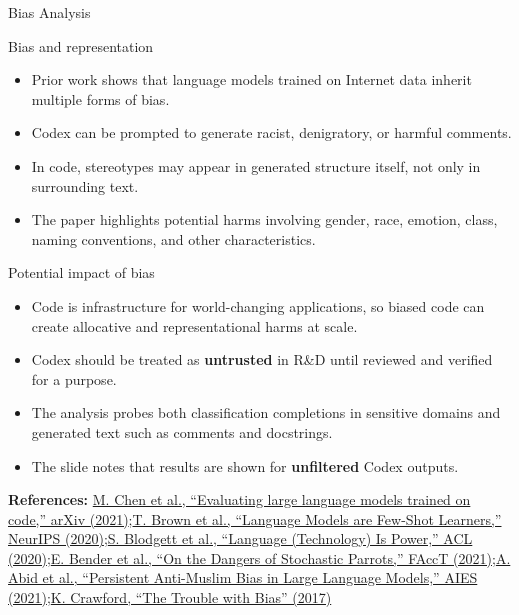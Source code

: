 \documentclass[aspectratio=43,9pt]{beamer}
\newcommand{\srclink}[2]{\href{#2}{\textcolor{black!68}{#1}}}
\newcommand{\sep}{;\hspace{0.35em}}
\newcommand{\refline}[2][References]{%
  \vfill
  {\raggedright\fontsize{5.1}{5.5}\selectfont\color{black!68}\textbf{#1:} #2\par}%
}
\newcommand{\srcChen}{\srclink{M. Chen et al., ``Evaluating large language models trained on code,'' arXiv (2021)}{https://arxiv.org/abs/2107.03374}}
\newcommand{\srcBrown}{\srclink{T. Brown et al., ``Language Models are Few-Shot Learners,'' NeurIPS (2020)}{https://arxiv.org/abs/2005.14165}}
\newcommand{\srcBlodgett}{\srclink{S. Blodgett et al., ``Language (Technology) Is Power,'' ACL (2020)}{https://aclanthology.org/2020.acl-main.485/}}
\newcommand{\srcBender}{\srclink{E. Bender et al., ``On the Dangers of Stochastic Parrots,'' FAccT (2021)}{https://s10251.pcdn.co/pdf/2021-bender-parrots.pdf}}
\newcommand{\srcAbid}{\srclink{A. Abid et al., ``Persistent Anti-Muslim Bias in Large Language Models,'' AIES (2021)}{https://arxiv.org/abs/2101.05783}}
\newcommand{\srcCrawfordBias}{\srclink{K. Crawford, ``The Trouble with Bias'' (2017)}{https://ainowinstitute.org/news/the-trouble-with-bias}}
\begin{document}
\begin{frame}{Bias Analysis}
\scriptsize
\begin{block}{Bias and representation}
\begin{itemize}
  \item Prior work shows that language models trained on Internet data inherit multiple forms of bias.
  \item Codex can be prompted to generate racist, denigratory, or harmful comments.
  \item In code, stereotypes may appear in generated structure itself, not only in surrounding text.
  \item The paper highlights potential harms involving gender, race, emotion, class, naming conventions, and other characteristics.
\end{itemize}
\end{block}

\begin{block}{Potential impact of bias}
\begin{itemize}
  \item Code is infrastructure for world-changing applications, so biased code can create allocative and representational harms at scale.
  \item Codex should be treated as \textbf{untrusted} in R\&D until reviewed and verified for a purpose.
  \item The analysis probes both classification completions in sensitive domains and generated text such as comments and docstrings.
  \item The slide notes that results are shown for \textbf{unfiltered} Codex outputs.
\end{itemize}
\end{block}

\refline{\srcChen\sep \srcBrown\sep \srcBlodgett\sep \srcBender\sep \srcAbid\sep \srcCrawfordBias}
\end{frame}
\end{document}
